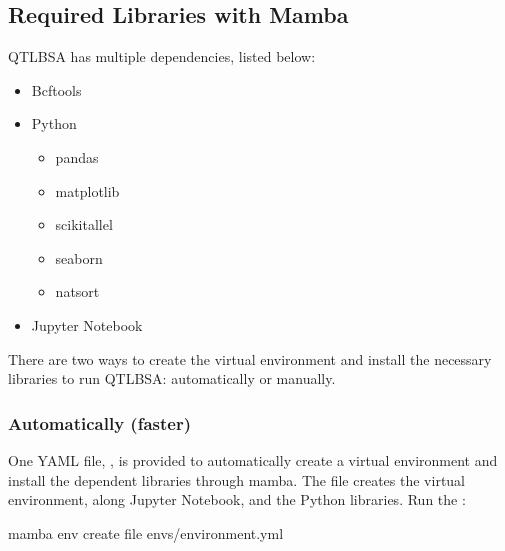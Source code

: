 \documentclass[letterpaper,10pt,english]{sphinxhowto}
\begin{document}
\subsection{Required Libraries with Mamba}
\label{\detokenize{index:required-libraries-with-mamba}}
\sphinxAtStartPar
QTL\sphinxhyphen{}BSA has multiple dependencies, listed below:
\begin{itemize}
\item {} 
\sphinxAtStartPar
Bcftools

\item {} 
\sphinxAtStartPar
Python
\begin{itemize}
\item {} 
\sphinxAtStartPar
pandas

\item {} 
\sphinxAtStartPar
matplotlib

\item {} 
\sphinxAtStartPar
scikit\sphinxhyphen{}allel

\item {} 
\sphinxAtStartPar
seaborn

\item {} 
\sphinxAtStartPar
natsort

\end{itemize}

\item {} 
\sphinxAtStartPar
Jupyter Notebook

\end{itemize}

\sphinxAtStartPar
There are two ways to create the  virtual environment and install the necessary libraries to run QTL\sphinxhyphen{}BSA: automatically or manually.


\subsubsection{Automatically (faster)}
\label{\detokenize{index:automatically-faster}}
\sphinxAtStartPar
One YAML file, , is provided to automatically create a virtual environment and install the dependent libraries through mamba. The file creates the  virtual environment, along Jupyter Notebook, and the Python libraries. Run the :

\begin{sphinxVerbatim}[commandchars=\\\{\}]
\PYGZdl{} mamba env create \PYGZhy{}\PYGZhy{}file envs/environment.yml
\end{sphinxVerbatim}
\end{document}
